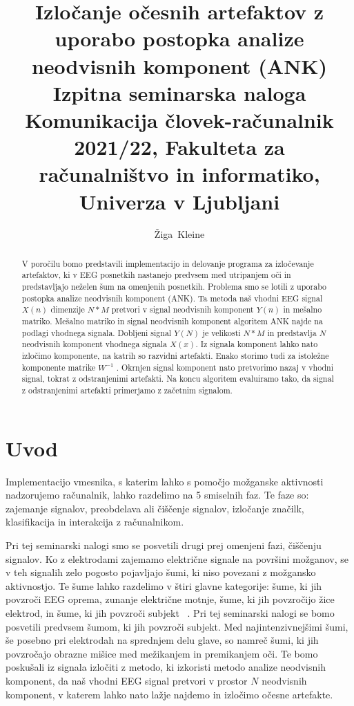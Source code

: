 \documentclass[9pt]{IEEEtran}
\title{\vspace{0ex} %
Izločanje očesnih artefaktov z uporabo postopka
analize neodvisnih komponent (ANK)
\\ \large{Izpitna seminarska naloga}\\ \normalsize{Komunikacija človek-računalnik 2021/22, Fakulteta za računalništvo in informatiko, Univerza v Ljubljani}}
\author{ %
Žiga~Kleine
\vspace{-4.0ex}
}
\begin{document}
\maketitle

\begin{abstract}

V poročilu bomo predstavili implementacijo in delovanje programa za izločevanje artefaktov, ki v EEG posnetkih nastanejo predvsem med utripanjem oči in predstavljajo neželen šum na omenjenih posnetkih. Problema smo se lotili z uporabo postopka analize neodvisnih komponent (ANK). Ta metoda naš vhodni EEG signal $X(n)$ dimenzije $N*M$ pretvori v signal neodvisnih komponent $Y(n)$ in mešalno matriko. Mešalno matriko in signal neodvisnih komponent algoritem ANK najde na podlagi vhodnega signala. Dobljeni signal $Y(N)$ je velikosti $N*M$ in predstavlja $N$ neodvisnih komponent vhodnega signala $X(x)$. Iz signala komponent lahko nato izločimo komponente, na katrih so razvidni artefakti. Enako storimo tudi za istoležne komponente matrike $W^{-1}$ . Okrnjen signal komponent nato pretvorimo nazaj v vhodni signal, tokrat z odstranjenimi artefakti. Na koncu algoritem evaluiramo tako, da signal z odstranjenimi artefakti primerjamo z začetnim signalom.


\end{abstract}

\section{Uvod}

Implementacijo vmesnika, s katerim lahko s pomočjo možganske aktivnosti nadzorujemo računalnik, lahko razdelimo na 5 smiselnih faz. Te faze so: zajemanje signalov, preobdelava ali čiščenje signalov, izločanje značilk, klasifikacija in interakcija z računalnikom.

Pri tej seminarski nalogi smo se posvetili drugi prej omenjeni fazi, čiščenju signalov. Ko z elektrodami zajemamo električne signale na površini možganov, se v teh signalih zelo pogosto pojavljajo šumi, ki niso povezani z možgansko aktivnostjo. Te šume lahko razdelimo v štiri glavne kategorije: šume, ki jih povzroči EEG oprema, zunanje električne motnje, šume, ki jih povzročijo žice elektrod, in šume, ki jih povzroči subjekt ~\cite{gupta1996preprocessing}. Pri tej seminarski nalogi se bomo posvetili predvsem šumom, ki jih povzroči subjekt. Med najintenzivnejšimi šumi, še posebno pri elektrodah na sprednjem delu glave, so namreč šumi, ki jih povzročajo obrazne mišice med mežikanjem in premikanjem oči. Te bomo poskušali iz signala izločiti z metodo, ki izkoristi metodo analize neodvisnih komponent, da naš vhodni EEG signal pretvori v prostor $N$ neodvisnih komponent, v katerem lahko nato lažje najdemo in izločimo očesne artefakte.
\end{document}
